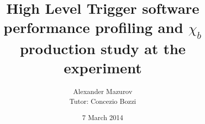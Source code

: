 \title[chib status report]{High Level Trigger software performance profiling and $\chi_{b}$ production study at the \lhcb experiment}
\author{Alexander Mazurov\\Tutor: Concezio Bozzi}
\date{7 March 2014}
